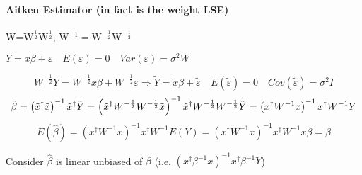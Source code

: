\documentclass{article}
\begin{document}
\bigskip

\paragraph{Aitken Estimator (in fact is the weight LSE)}

\quad

\bigskip 

W=W$^{\frac{1}{2}}$W$^{\frac{1}{2}}$, W$^{-1}=$W$^{-\frac{1}{2}}$W$^{-\frac{1%
}{2}}$

$Y=x\beta +\varepsilon \quad E\left( \varepsilon \right) =0\quad Var\left(
\varepsilon \right) =\sigma ^{2}W$

\begin{equation*}
W^{-\frac{1}{2}}Y=W^{-\frac{1}{2}}x\beta +W^{-\frac{1}{2}}\varepsilon
\Rightarrow \tilde{Y}=\tilde{x}\beta +\tilde{\varepsilon}\quad E\left( 
\tilde{\varepsilon}\right) =0\quad Cov\left( \tilde{\varepsilon}\right)
=\sigma ^{2}I
\end{equation*}%
\begin{equation*}
\hat{\beta}=\left( \tilde{x}^{\dagger }\tilde{x}\right) ^{-1}\tilde{x}%
^{\dagger }\tilde{Y}=\left( \tilde{x}^{\dagger }W^{-\frac{1}{2}}W^{-\frac{1}{%
2}}\tilde{x}\right) ^{-1}\tilde{x}^{\dagger }W^{-\frac{1}{2}}W^{-\frac{1}{2}}%
\tilde{Y}=\left( x^{\dagger }W^{-1}x\right) ^{-1}x^{\dagger }W^{-1}Y
\end{equation*}%
\begin{equation*}
E\left( \hat{\beta}\right) =\left( x^{\dagger }W^{-1}x\right)
^{-1}x^{\dagger }W^{-1}E\left( Y\right) =\left( x^{\dagger }W^{-1}x\right)
^{-1}x^{\dagger }W^{-1}x\beta =\beta
\end{equation*}

Consider $\hat{\beta}$ is linear unbiased of $\beta $ (i.e. $\left(
x^{\dagger }\beta ^{-1}x\right) ^{-1}x^{\dagger }\beta ^{-1}Y$)
\end{document}
